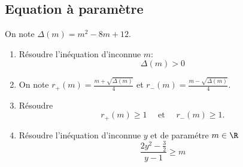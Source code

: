 \subsection{Equation à paramètre}

\vspace{0.5cm}
\begin{exercice}
On note $\Delta(m) =m^2-8m+12$.  
\begin{enumerate}
\item Résoudre l'inéquation d'inconnue $m$: 
\begin{equation}\tag{$I_1$}
\Delta(m)>0
\end{equation}
\item On note $r_+(m) =\frac{m+\sqrt{\Delta(m)}}{4}$ et $r_-(m) =\frac{m-\sqrt{\Delta(m)}}{4}$.\\
\item Résoudre 
$$r_+(m)\geq 1 \quad \text{ et } \quad r_-(m)\geq 1 .$$
\item  Résoudre l'inéquation d'inconnue $y$ et de paramétre $m\in \R$
\begin{equation}\tag{$I_2$}
  \frac{2y^2-\frac{3}{2}}{y-1}\geq m
\end{equation}
\end{enumerate}
\end{exercice}


